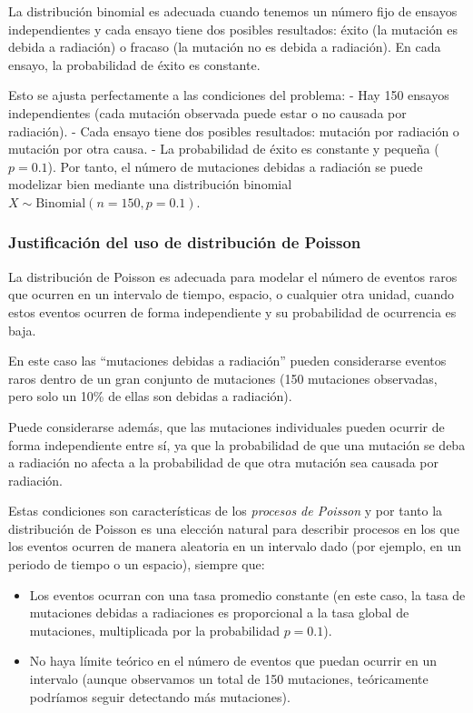 \documentclass[
]{article}
\providecommand{\tightlist}{%
  \setlength{\itemsep}{0pt}\setlength{\parskip}{0pt}}
\begin{document}
La distribución binomial es adecuada cuando tenemos un número fijo de ensayos independientes y cada ensayo tiene dos posibles resultados: éxito (la mutación es debida a radiación) o fracaso (la mutación no es debida a radiación). En cada ensayo, la probabilidad de éxito es constante.

Esto se ajusta perfectamente a las condiciones del problema:
- Hay 150 ensayos independientes (cada mutación observada puede estar o no causada por radiación).
- Cada ensayo tiene dos posibles resultados: mutación por radiación o mutación por otra causa.
- La probabilidad de éxito es constante y pequeña (\(p = 0.1\)).
Por tanto, el número de mutaciones debidas a radiación se puede modelizar bien mediante una distribución binomial \(X \sim \text{Binomial}(n = 150, p = 0.1)\).

\subsubsection{Justificación del uso de distribución de Poisson}\label{justificaciuxf3n-del-uso-de-distribuciuxf3n-de-poisson}

La distribución de Poisson es adecuada para modelar el número de eventos raros que ocurren en un intervalo de tiempo, espacio, o cualquier otra unidad, cuando estos eventos ocurren de forma independiente y su probabilidad de ocurrencia es baja.

En este caso las ``mutaciones debidas a radiación'' pueden considerarse eventos raros dentro de un gran conjunto de mutaciones (150 mutaciones observadas, pero solo un 10\% de ellas son debidas a radiación).

Puede considerarse además, que las mutaciones individuales pueden ocurrir de forma independiente entre sí, ya que la probabilidad de que una mutación se deba a radiación no afecta a la probabilidad de que otra mutación sea causada por radiación.

Estas condiciones son características de los \emph{procesos de Poisson} y por tanto la distribución de Poisson es una elección natural para describir procesos en los que los eventos ocurren de manera aleatoria en un intervalo dado (por ejemplo, en un periodo de tiempo o un espacio), siempre que:

\begin{itemize}
\tightlist
\item
  Los eventos ocurran con una tasa promedio constante (en este caso, la tasa de mutaciones debidas a radiaciones es proporcional a la tasa global de mutaciones, multiplicada por la probabilidad \(p = 0.1\)).
\item
  No haya límite teórico en el número de eventos que puedan ocurrir en un intervalo (aunque observamos un total de 150 mutaciones, teóricamente podríamos seguir detectando más mutaciones).
\end{itemize}
\end{document}
